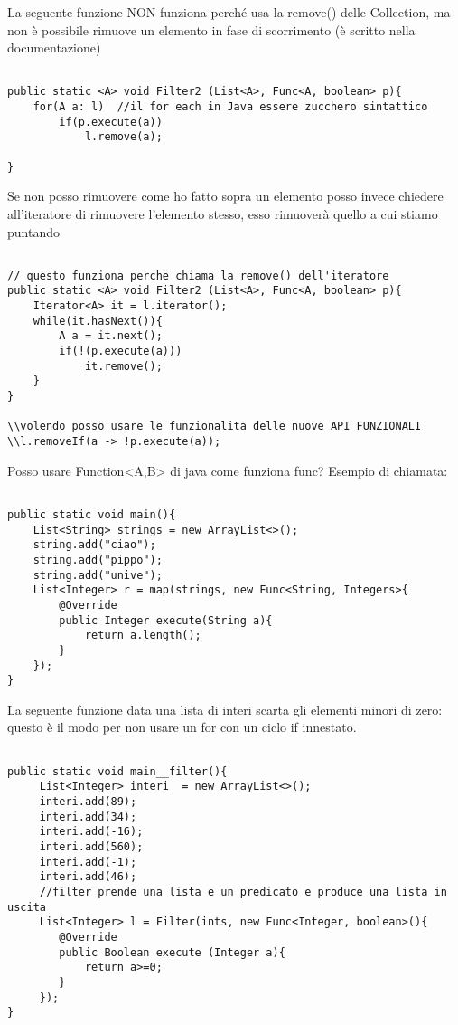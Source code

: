 \noindent La seguente funzione NON funziona perché usa la remove() delle Collection, ma non è possibile rimuove un elemento in fase di scorrimento (è scritto nella documentazione)

\begin{lstlisting}[basicstyle=\small,]

public static <A> void Filter2 (List<A>, Func<A, boolean> p){
	for(A a: l)  //il for each in Java essere zucchero sintattico
		if(p.execute(a))
			l.remove(a);

}

\end{lstlisting}
Se non posso rimuovere come ho fatto sopra un elemento posso invece chiedere all'iteratore di rimuovere l'elemento stesso, esso rimuoverà quello a cui stiamo puntando

\begin{lstlisting}[basicstyle=\small,]

// questo funziona perche chiama la remove() dell'iteratore
public static <A> void Filter2 (List<A>, Func<A, boolean> p){
	Iterator<A> it = l.iterator();
	while(it.hasNext()){
		A a = it.next();
		if(!(p.execute(a)))
			it.remove();
	}
}

\\volendo posso usare le funzionalita delle nuove API FUNZIONALI
\\l.removeIf(a -> !p.execute(a));
\end{lstlisting}

\noindent Posso usare Function<A,B> di java come funziona func? \newline
Esempio di chiamata:

\begin{lstlisting}[basicstyle=\small,]

public static void main(){
	List<String> strings = new ArrayList<>();
	string.add("ciao");
	string.add("pippo");
	string.add("unive");
	List<Integer> r = map(strings, new Func<String, Integers>{
		@Override 
		public Integer execute(String a){
			return a.length();
		}	
	});
}
\end{lstlisting}


\noindent La seguente funzione data una lista di interi scarta gli elementi minori di zero: questo è il modo per non usare un for con un ciclo if innestato.

\begin{lstlisting}[basicstyle=\small,]

public static void main__filter(){
	 List<Integer> interi  = new ArrayList<>();
	 interi.add(89);
	 interi.add(34);
	 interi.add(-16);
	 interi.add(560);
	 interi.add(-1);
	 interi.add(46);
	 //filter prende una lista e un predicato e produce una lista in uscita
	 List<Integer> l = Filter(ints, new Func<Integer, boolean>(){
	 	@Override
	 	public Boolean execute (Integer a){
	 		return a>=0;
	 	}
	 });
}
\end{lstlisting}

